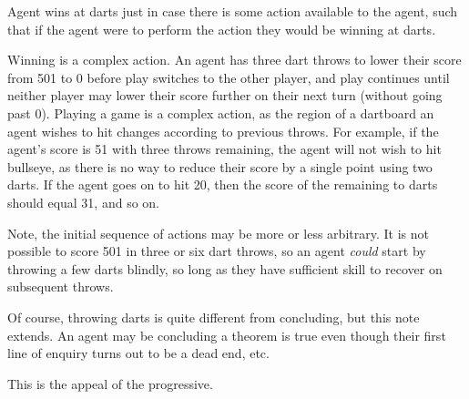 \begin{note}
  \begin{illustration}[Darts]
    Agent wins at darts just in case there is some action available to the agent, such that if the agent were to perform the action they would be winning at darts.

    Winning is a complex action.
  An agent has three dart throws to lower their score from 501 to 0 before play switches to the other player, and play continues until neither player may lower their score further on their next turn (without going past 0).
  Playing a game is a complex action, as the region of a dartboard an agent wishes to hit changes according to previous throws.
  For example, if the agent's score is 51 with three throws remaining, the agent will not wish to hit bullseye, as there is no way to reduce their score by a single point using two darts.
  If the agent goes on to hit 20, then the score of the remaining to darts should equal 31, and so on.
  \end{illustration}

  Note, the initial sequence of actions may be more or less arbitrary.
  It is not possible to score 501 in three or six dart throws, so an agent \emph{could} start by throwing a few darts blindly, so long as they have sufficient skill to recover on subsequent throws.

  Of course, throwing darts is quite different from concluding, but this note extends.
  An agent may be concluding a theorem is true even though their first line of enquiry turns out to be a dead end, etc.

  This is the appeal of the progressive.
\end{note}


